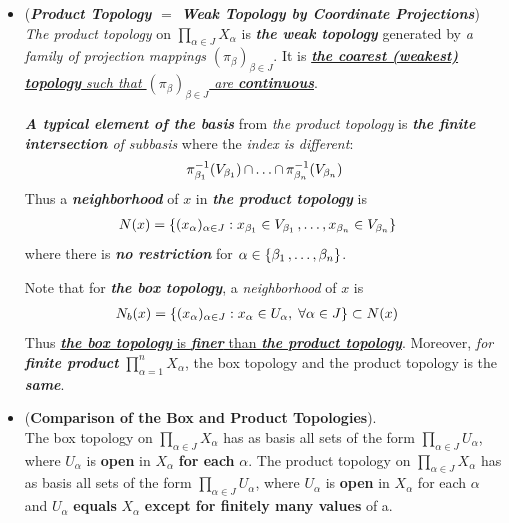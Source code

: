 \documentclass[11pt]{article}
\begin{document}
\begin{itemize}
\item \begin{remark} (\emph{\textbf{Product Topology $=$ Weak Topology by Coordinate Projections}})\\
\emph{The product topology} on $\prod_{\alpha \in J} X_{\alpha}$ is \emph{\textbf{the weak topology}} generated by \emph{a family of projection mappings} $(\pi_{\beta})_{\beta \in J}$. It is \underline{\emph{\textbf{the coarest (weakest) topology} such that $(\pi_{\beta})_{\beta \in J}$ are \textbf{continuous}}}.

\emph{\textbf{A typical element of the basis}} from \emph{the product topology} is \emph{\textbf{the finite intersection} of subbasis} where the \emph{index is different}:
\begin{align*}
\pi_{\beta_1}^{-1}(V_{\beta_1}) \,{\cap}\ldots{\cap}\, \pi_{\beta_n}^{-1}(V_{\beta_n})
\end{align*} Thus a \emph{\textbf{neighborhood}} of $x$ in \emph{\textbf{the product topology}} is \
\begin{align*}
N(x) &= \left\{(x_{\alpha})_{\alpha \in J}:  x_{\beta_1} \in V_{\beta_1} \,{,}\ldots{,}\, x_{\beta_n} \in V_{\beta_n}\right\}
\end{align*} where there is \emph{\textbf{no restriction}} for $\alpha \in \left\{\beta_1 \,{,}\ldots{,}\, \beta_n\right\}$.

Note that for \emph{\textbf{the box topology}}, a \emph{neighborhood} of $x$ is
\begin{align*}
N_b(x) &= \left\{(x_{\alpha})_{\alpha \in J}:  x_{\alpha} \in U_{\alpha}, \; \forall \alpha \in J\right\} \subset N(x)
\end{align*} Thus \underline{\emph{\textbf{the box topology}} is \emph{\textbf{finer}} than \emph{\textbf{the product topology}}}. Moreover, \emph{for \textbf{finite product}}  $\prod_{\alpha =1}^{n} X_{\alpha}$, the box topology and the product topology is the \emph{\textbf{same}}.
\end{remark}

\item \begin{proposition}(\textbf{Comparison of the Box and Product Topologies}). \citep{munkres2000topology} \\
The box  topology on $\prod_{\alpha \in J} X_{\alpha}$ has as basis all sets of the form $\prod_{\alpha \in J} U_{\alpha}$, where $U_{\alpha}$ is \textbf{open} in $X_{\alpha}$ \textbf{for each} $\alpha$. The product topology on $\prod_{\alpha \in J} X_{\alpha}$ has as basis all sets of the form $\prod_{\alpha \in J} U_{\alpha}$, where $U_{\alpha}$  is \textbf{open} in $X_{\alpha}$ for each $\alpha$ and $U_{\alpha}$ \textbf{equals} $X_{\alpha}$ \textbf{except for finitely many values} of a.
\end{proposition}


\end{itemize}
\end{document}

